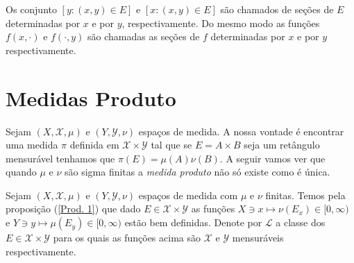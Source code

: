 \begin{observacao}
Os conjunto $[y: (x,y)\in E]$ e $[x: (x,y)\in E]$ 
são chamados de seções de $E$ determinadas por $x$ e 
por $y$, respectivamente. Do mesmo modo as funções $f(x, \cdot)$ e $f(\cdot, y)$ 
são chamadas as seções de $f$ determinadas por $x$ e por $y$ respectivamente.
\end{observacao}



\section{Medidas Produto}
Sejam $(X, \mathscr{X}, \mu)$ e $(Y, \mathscr{Y}, \nu)$
 espaços de medida. A nossa  vontade é encontrar uma medida $\pi$ definida 
 em $\mathscr{X}\times \mathscr{Y}$ tal que se $E=A\times B$ seja um retângulo mensurável 
 tenhamos que $\pi(E)=\mu(A)\nu(B)$. A seguir vamos ver que quando 
 $ \mu$ e $\nu$ são sigma finitas a \emph{medida produto} não só existe como é única.
 \medskip
 

Sejam $(X, \mathscr{X}, \mu)$ e $(Y, \mathscr{Y}, \nu)$
 espaços de medida com $\mu$ e $\nu$ finitas. 
 Temos pela proposição (\ref{Prod. 1}) que dado
  $E\in \mathscr{X}\times \mathscr{Y}$ as funções 
  $X\ni x\mapsto \nu(E_x)\in [0, \infty)$ e
   $Y\ni y\mapsto \mu(E_y)\in [0, \infty)$ estão bem definidas.
Denote por $\mathscr{L}$ a classe dos $E\in \mathscr{X}\times \mathscr{Y}$
para os quais as funções acima são $\mathscr{X}$ e $\mathscr{Y}$ mensuráveis 
respectivamente.

